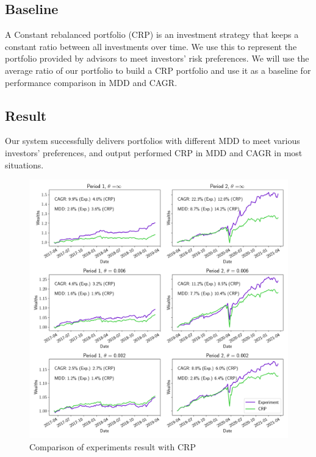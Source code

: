 \subsection{Baseline}
A Constant rebalanced portfolio (CRP) is an investment strategy that keeps a constant ratio between all investments over time. We use this to represent the portfolio provided by advisors to meet investors' risk preferences. We will use the average ratio of our portfolio to build a CRP portfolio and use it as a baseline for performance comparison in MDD and CAGR.
\subsection{Result}
Our system successfully delivers portfolios with different MDD to meet various investors' preferences, and output performed CRP in MDD and CAGR in most situations.

\begin{figure}[htb]
\centering
  \includegraphics[width=16cm]{images/crp_compare.png}
  \caption [Comparison of experiments result with CRP]{Comparison of experiments result with CRP}
  \label{fig:crp_compare}
\end{figure}